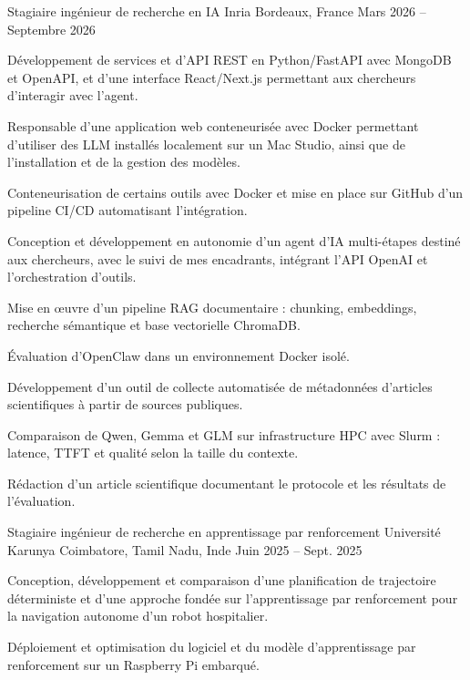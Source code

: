 
\begin{cventries}
  \cventry
    {Stagiaire ingénieur de recherche en IA}
    {Inria}
    {Bordeaux, France}
    {Mars 2026 -- Septembre 2026}
    {
      \begin{cvitems}
        \item {Développement de services et d’API REST en Python/FastAPI avec MongoDB et OpenAPI, et d’une interface React/Next.js permettant aux chercheurs d’interagir avec l’agent.}
        \item {Responsable d’une application web conteneurisée avec Docker permettant d’utiliser des LLM installés localement sur un Mac Studio, ainsi que de l’installation et de la gestion des modèles.}
        \item {Conteneurisation de certains outils avec Docker et mise en place sur GitHub d’un pipeline CI/CD automatisant l’intégration.}
        \item {Conception et développement en autonomie d’un agent d’IA multi-étapes destiné aux chercheurs, avec le suivi de mes encadrants, intégrant l’API OpenAI et l’orchestration d’outils.}
        \item {Mise en œuvre d’un pipeline RAG documentaire : chunking, embeddings, recherche sémantique et base vectorielle ChromaDB.}
        \item {Évaluation d’OpenClaw dans un environnement Docker isolé.}
        \item {Développement d’un outil de collecte automatisée de métadonnées d’articles scientifiques à partir de sources publiques.}
        \item {Comparaison de Qwen, Gemma et GLM sur infrastructure HPC avec Slurm : latence, TTFT et qualité selon la taille du contexte.}
        \item {Rédaction d’un article scientifique documentant le protocole et les résultats de l’évaluation.}
      \end{cvitems}
    }

  \cventry
    {Stagiaire ingénieur de recherche en apprentissage par renforcement}
    {Université Karunya}
    {Coimbatore, Tamil Nadu, Inde}
    {Juin 2025 -- Sept. 2025}
    {
      \begin{cvitems}
        \item {Conception, développement et comparaison d’une planification de trajectoire déterministe et d’une approche fondée sur l’apprentissage par renforcement pour la navigation autonome d’un robot hospitalier.}
        \item {Déploiement et optimisation du logiciel et du modèle d’apprentissage par renforcement sur un Raspberry Pi embarqué.}
      \end{cvitems}
    }
\end{cventries}

